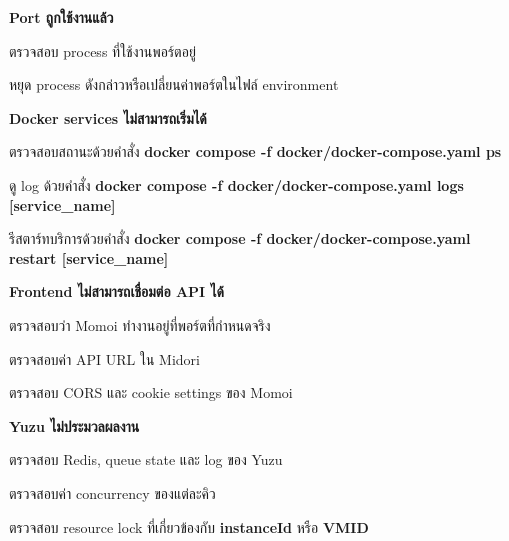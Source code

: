 \begin{mycustomenum2}
    \item \textbf{Port ถูกใช้งานแล้ว}
    \begin{mycustomenum2}
        \item ตรวจสอบ process ที่ใช้งานพอร์ตอยู่
        \item หยุด process ดังกล่าวหรือเปลี่ยนค่าพอร์ตในไฟล์ environment
    \end{mycustomenum2}
    \item \textbf{Docker services ไม่สามารถเริ่มได้}
    \begin{mycustomenum2}
        \item ตรวจสอบสถานะด้วยคำสั่ง \textbf{docker compose -f docker/docker-compose.yaml ps}
        \item ดู log ด้วยคำสั่ง \textbf{docker compose -f docker/docker-compose.yaml logs [service\_name]}
        \item รีสตาร์ทบริการด้วยคำสั่ง \textbf{docker compose -f docker/docker-compose.yaml restart [service\_name]}
    \end{mycustomenum2}
    \item \textbf{Frontend ไม่สามารถเชื่อมต่อ API ได้}
    \begin{mycustomenum2}
        \item ตรวจสอบว่า Momoi ทำงานอยู่ที่พอร์ตที่กำหนดจริง
        \item ตรวจสอบค่า API URL ใน Midori
        \item ตรวจสอบ CORS และ cookie settings ของ Momoi
    \end{mycustomenum2}
    \item \textbf{Yuzu ไม่ประมวลผลงาน}
    \begin{mycustomenum2}
        \item ตรวจสอบ Redis, queue state และ log ของ Yuzu
        \item ตรวจสอบค่า concurrency ของแต่ละคิว
        \item ตรวจสอบ resource lock ที่เกี่ยวข้องกับ \textbf{instanceId} หรือ \textbf{VMID}
    \end{mycustomenum2}
\end{mycustomenum2}
